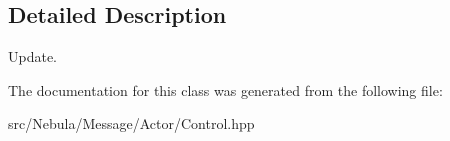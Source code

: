 \subsection{\-Detailed \-Description}
\-Update. 

\-The documentation for this class was generated from the following file\-:\begin{DoxyCompactItemize}
\item 
src/\-Nebula/\-Message/\-Actor/\-Control.\-hpp\end{DoxyCompactItemize}
